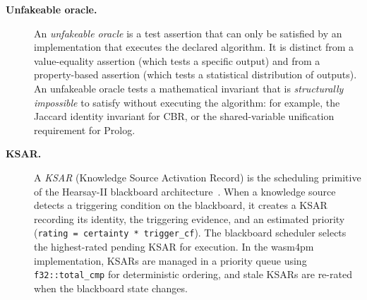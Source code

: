 \begin{description}
\item[\textbf{Unfakeable oracle.}]
An \emph{unfakeable oracle} is a test assertion that can only be satisfied by an
implementation that executes the declared algorithm.
It is distinct from a value-equality assertion (which tests a specific output) and from
a property-based assertion (which tests a statistical distribution of outputs).
An unfakeable oracle tests a mathematical invariant that is \emph{structurally impossible}
to satisfy without executing the algorithm: for example, the Jaccard identity invariant
for CBR, or the shared-variable unification requirement for Prolog.

\item[\textbf{KSAR.}]
A \emph{KSAR} (Knowledge Source Activation Record) is the scheduling primitive of the
Hearsay-II blackboard architecture~\cite{erman1980hearsay}.
When a knowledge source detects a triggering condition on the blackboard, it creates a
KSAR recording its identity, the triggering evidence, and an estimated priority
(\texttt{rating = certainty * trigger\_cf}).
The blackboard scheduler selects the highest-rated pending KSAR for execution.
In the wasm4pm implementation, KSARs are managed in a priority queue using
\texttt{f32::total\_cmp} for deterministic ordering, and stale KSARs are re-rated when
the blackboard state changes.

\end{description}

